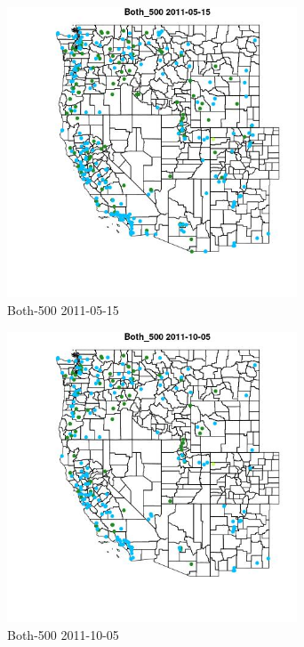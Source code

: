 \begin{figure} 
\centering  
\includegraphics[width=0.77\textwidth]{Code_Outputs/ML_input_report_ML_input_PM25_Step5_part_d_de_duplicated_aves_ML_input_MapObsBoth_5002011-05-15.jpg} 
\caption{\label{fig:ML_input_report_ML_input_PM25_Step5_part_d_de_duplicated_aves_ML_inputMapObsBoth_5002011-05-15}Both-500 2011-05-15} 
\end{figure} 
 

\clearpage 

\begin{figure} 
\centering  
\includegraphics[width=0.77\textwidth]{Code_Outputs/ML_input_report_ML_input_PM25_Step5_part_d_de_duplicated_aves_ML_input_MapObsBoth_5002011-10-05.jpg} 
\caption{\label{fig:ML_input_report_ML_input_PM25_Step5_part_d_de_duplicated_aves_ML_inputMapObsBoth_5002011-10-05}Both-500 2011-10-05} 
\end{figure} 
 

